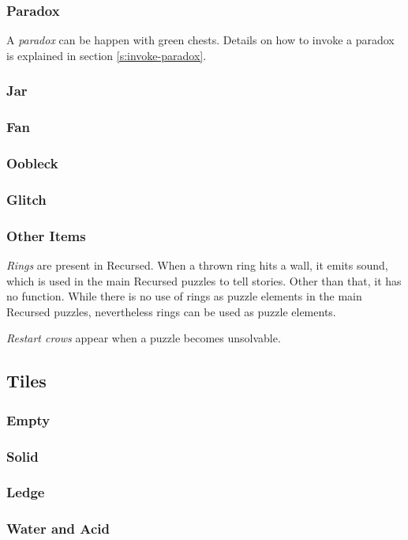 \documentclass[a4paper]{article}
\theoremstyle{definition}
\begin{document}
\subsubsection{Paradox}
A \emph{paradox} can be happen with green chests.
Details on how to invoke a paradox is explained in section \ref{s:invoke-paradox}.
\subsubsection{Jar}
\subsubsection{Fan}
\subsubsection{Oobleck}
\subsubsection{Glitch}
\subsubsection{Other Items}
\emph{Rings} are present in Recursed. When a thrown ring hits a wall, it emits sound, which is used in the main Recursed puzzles
to tell stories. Other than that, it has no function. While there is no use of rings as puzzle elements in the main Recursed puzzles,
nevertheless rings can be used as puzzle elements.

\emph{Restart crows} appear when a puzzle becomes unsolvable.

\subsection{Tiles}
\subsubsection{Empty}
\subsubsection{Solid}
\subsubsection{Ledge}
\subsubsection{Water and Acid}
\end{document}
